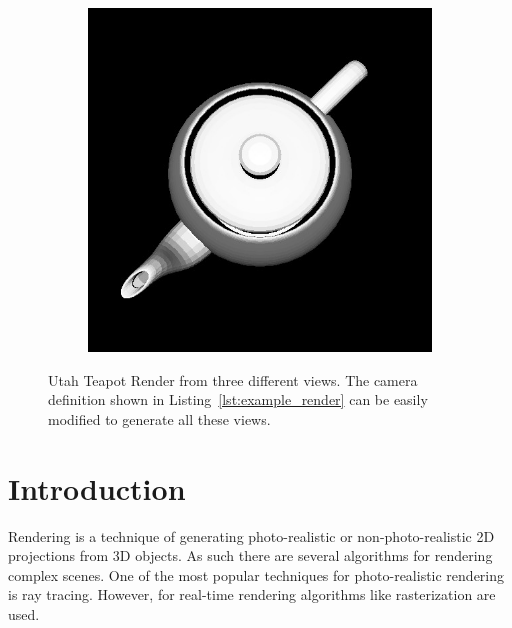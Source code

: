\documentclass{juliacon}
\begin{document}
\begin{figure}[!htb]
\begin{subfigure}[b]{0.3\textwidth}
        \caption*{}
    \end{subfigure}
    \hfill
    \begin{subfigure}[b]{0.3\textwidth}
        \centering
        \includegraphics[width=\textwidth]{images/render/teapot_top.jpg}
        \caption*{}
    \end{subfigure}
    \caption{Utah Teapot Render from three different views. The camera definition shown in Listing~\protect\ref{lst:example_render} can be easily modified to generate all these views.}
    \label{fig:teapot_render}
\end{figure}

\section{Introduction}
\label{intro}

Rendering is a technique of generating photo-realistic or non-photo-realistic 2D projections from 3D objects. As such there are several algorithms for rendering complex scenes. One of the most popular techniques for photo-realistic rendering is ray tracing. However, for real-time rendering algorithms like rasterization are used.
\end{document}
